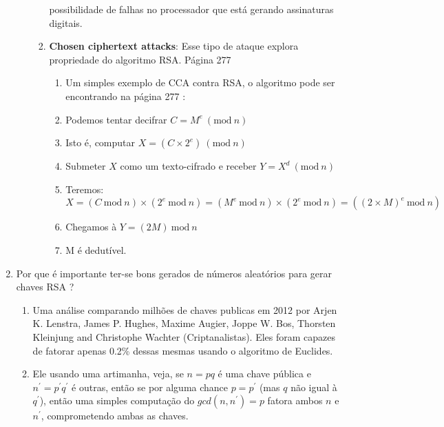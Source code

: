 \documentclass[conference]{IEEEtran}
\begin{document}
\begin{enumerate}
\begin{enumerate}
\begin{enumerate}
          possibilidade de falhas no processador que está gerando assinaturas
          digitais.
          \item \textbf{Chosen ciphertext attacks}: Esse tipo de ataque
          explora propriedade do algoritmo RSA. Página 277 \cite{stallings}
            \begin{enumerate}
              \item Um simples exemplo de CCA contra RSA, o algoritmo pode ser
              encontrando na página 277 \cite{stallings}:
              \item Podemos tentar decifrar $C = M^e \ (\textrm{mod}\ n)$
              \item Isto é, computar $X = (C \times 2^e) \ (\textrm{mod}\ n)$
              \item Submeter $X$ como um texto-cifrado e receber $Y = X^d \
              (\textrm{mod}\ n)$
              \item Teremos: $X  = (C \ \textrm{mod}\ n) \times (2^e \
              \textrm{mod}\ n) = (M^e \ \textrm{mod}\ n) \times (2^e \
              \textrm{mod}\ n) = ((2 \times M)^e \ \textrm{mod}\ n)$
              \item Chegamos à $Y = (2M) \ \textrm{mod}\ n$
              \item M é dedutível.
            \end{enumerate}
        \end{enumerate}
    \end{enumerate}

  \item Por que é importante ter-se bons gerados de números aleatórios para
  gerar chaves RSA ?

    \begin{enumerate}
      \item Uma análise comparando milhões de chaves publicas em 2012 por Arjen
      K. Lenstra, James P. Hughes, Maxime Augier, Joppe W. Bos, Thorsten
      Kleinjung and Christophe Wachter (Criptanalistas). Eles foram capazes de
      fatorar apenas 0.2\% dessas mesmas usando o algoritmo de Euclides.
      \cite{markoff} \cite{ronwaswrong}
      
      \item Ele usando uma artimanha, veja, se $n = pq$ é uma chave pública e
      $n^{'} = p^{'}q^{'}$ é outras, então se por alguma chance $p = p^{'}$ (mas
      $q$ não igual à $q^{'}$), então uma simples computação do $gcd(n, n^{'}) =
      p$ fatora ambos $n$ e $n^{'}$, comprometendo ambas as chaves.
      

\end{enumerate}
\end{enumerate}
\end{document}

